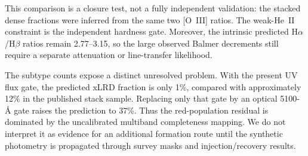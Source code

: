 This comparison is a closure test, not a fully independent validation: the
stacked dense fractions were inferred from the same two [O~III] ratios. The
weak-He~II constraint is the independent hardness gate. Moreover, the
intrinsic predicted H$\alpha$/H$\beta$ ratios remain 2.77--3.15, so the large
observed Balmer decrements still require a separate attenuation or line-transfer
likelihood.

The subtype counts expose a distinct unresolved problem. With the present UV
flux gate, the predicted xLRD fraction is only 1\%, compared with approximately
12\% in the published stack sample. Replacing only that gate by an optical
5100-\AA{} gate raises the prediction to 37\%. Thus the red-population residual
is dominated by the uncalibrated multiband completeness mapping. We do not
interpret it as evidence for an additional formation route until the synthetic
photometry is propagated through survey masks and injection/recovery results.
